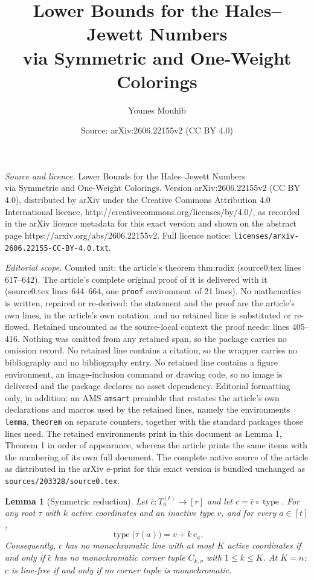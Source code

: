 \documentclass[10pt,a4paper]{amsart}
\title{Lower Bounds for the Hales--Jewett Numbers\\ via Symmetric and One-Weight Colorings}
\author{Younes Mouhib}
\date{Source: arXiv:2606.22155v2 (CC BY 4.0)}
\newtheorem{lemma}{Lemma}
\renewcommand{\le}{\leqslant}
\DeclareMathOperator{\type}{type}
\begin{document}
\maketitle

\noindent\emph{Source and licence.} Lower Bounds for the Hales--Jewett Numbers\\ via Symmetric and One-Weight Colorings. Version arXiv:2606.22155v2 (CC BY 4.0), distributed by arXiv under the Creative Commons Attribution 4.0 International licence, http://creativecommons.org/licenses/by/4.0/, as recorded in the arXiv licence metadata for this exact version and shown on the abstract page https://arxiv.org/abs/2606.22155v2. Full licence notice: \texttt{licenses/arxiv-2606.22155-CC-BY-4.0.txt}.\par\smallskip

\noindent\textit{Editorial scope.} Counted unit: the article's theorem thm:radix (source0.tex lines 617--642). The article's complete original proof of it is delivered with it (source0.tex lines 644--664, one \texttt{proof} environment of 21 lines). No mathematics is written, repaired or re-derived: the statement and the proof are the article's own lines, in the article's own notation, and no retained line is substituted or re-flowed.  Retained uncounted as the source-local context the proof needs: lines 405--416.  Nothing was omitted from any retained span, so the package carries no omission record.  No retained line contains a citation, so the wrapper carries no bibliography and no bibliography entry.  No retained line contains a figure environment, an image-inclusion command or drawing code, so no image is delivered and the package declares no asset dependency.  Editorial formatting only, in addition: an AMS \texttt{amsart} preamble that restates the article's own declarations and macros used by the retained lines, namely the environments \texttt{lemma}, \texttt{theorem} on separate counters, together with the standard packages those lines need.  The retained environments print in this document as Lemma 1, Theorem 1 in order of appearance, whereas the article prints the same items with the numbering of its own full document.  The complete native source of the article as distributed in the arXiv e-print for this exact version is bundled unchanged as \texttt{sources/203328/source0.tex}.
\begin{lemma}[Symmetric reduction]\label{lem:sym-reduction}
Let $\bar c\colon T_{n}^{(t)}\to[r]$ and let $c=\bar c\circ\type$. For
any root $\tau$ with $k$ active coordinates and an inactive type $v$,
and for every $a\in[t]$,
\begin{equation}\label{eq:type-identity}
\type\bigl(\tau(a)\bigr)=v+k\,e_{a}.
\end{equation}
Consequently, $c$ has no monochromatic line with at most $K$ active
coordinates if and only if $\bar c$ has no monochromatic corner tuple
$C_{k,v}$ with $1\le k\le K$. At $K=n$: $c$ is line-free if and only if
no corner tuple is monochromatic.
\end{lemma}
\end{document}
